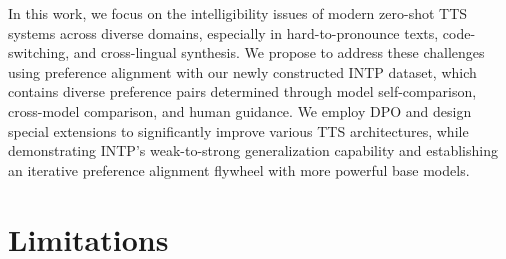 \documentclass[11pt]{article}
\begin{document}


In this work, we focus on the intelligibility issues of modern zero-shot TTS systems across diverse domains, especially in hard-to-pronounce texts, code-switching, and cross-lingual synthesis. We propose to address these challenges using preference alignment with our newly constructed INTP dataset, which contains diverse preference pairs determined through model self-comparison, cross-model comparison, and human guidance. We employ DPO and design  special extensions to significantly improve various TTS architectures, while demonstrating INTP's weak-to-strong generalization capability and establishing an iterative preference alignment flywheel with more powerful base models.



\section*{Limitations}
\end{document}
